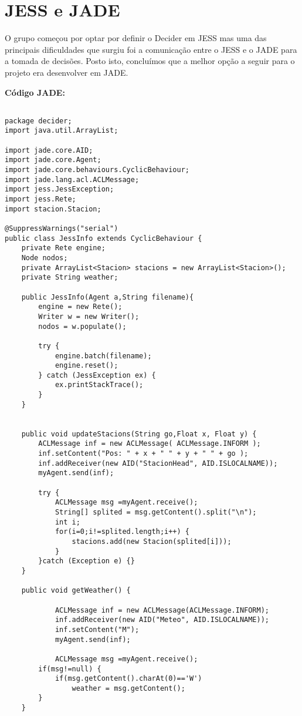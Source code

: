 \section{JESS e JADE}\label{sec:jess e jade}

O grupo começou por optar por definir o Decider em JESS mas uma das principais dificuldades que surgiu foi a comunicação entre o JESS e o JADE para a tomada de decisões. Posto isto, concluímos que a melhor opção a seguir para o projeto era desenvolver em JADE.

\textbf{Código JADE:}

\begin{lstlisting}

package decider;
import java.util.ArrayList;

import jade.core.AID;
import jade.core.Agent;
import jade.core.behaviours.CyclicBehaviour;
import jade.lang.acl.ACLMessage;
import jess.JessException;
import jess.Rete;
import stacion.Stacion;

@SuppressWarnings("serial")
public class JessInfo extends CyclicBehaviour {
	private Rete engine;
	Node nodos;
	private ArrayList<Stacion> stacions = new ArrayList<Stacion>();
	private String weather;
	
    public JessInfo(Agent a,String filename){
        engine = new Rete();
        Writer w = new Writer();
        nodos = w.populate();
        
        try {
        	engine.batch(filename);
            engine.reset();
        } catch (JessException ex) {
            ex.printStackTrace();
        }
    }
    
    
    public void updateStacions(String go,Float x, Float y) {
    	ACLMessage inf = new ACLMessage( ACLMessage.INFORM );
        inf.setContent("Pos: " + x + " " + y + " " + go );
        inf.addReceiver(new AID("StacionHead", AID.ISLOCALNAME));
        myAgent.send(inf);
        
        try {
	        ACLMessage msg =myAgent.receive();
	        String[] splited = msg.getContent().split("\n");
	        int i;
	        for(i=0;i!=splited.length;i++) {
	        	stacions.add(new Stacion(splited[i]));
	        }
        }catch (Exception e) {}
    }
    
    public void getWeather() {
    	
	    	ACLMessage inf = new ACLMessage(ACLMessage.INFORM);
			inf.addReceiver(new AID("Meteo", AID.ISLOCALNAME));
			inf.setContent("M");
			myAgent.send(inf);
			
			ACLMessage msg =myAgent.receive();
		if(msg!=null) {
			if(msg.getContent().charAt(0)=='W')
				weather = msg.getContent();
		}
    }
    

\end{lstlisting}

